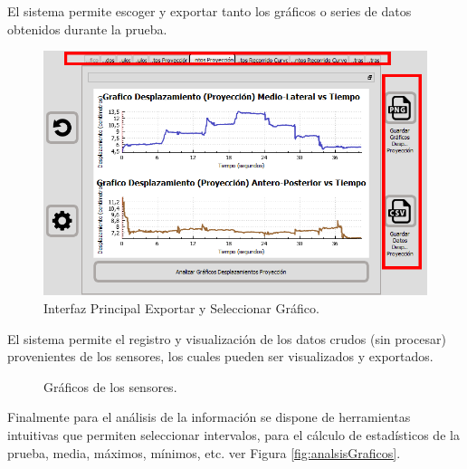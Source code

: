 \documentclass[12pt,a4paper]{article}
\begin{document}
El sistema permite escoger y exportar tanto los gráficos o series de datos obtenidos durante la prueba. 
\begin{figure}[H]
	\centering
	\includegraphics[scale=0.6]{images/graficosyreportes/graficos}
	\caption{Interfaz Principal Exportar y Seleccionar Gráfico.}
	\label{fig:exportargrafico}
\end{figure}
El sistema permite el registro y visualización de los datos crudos (sin procesar) provenientes de los sensores, los cuales pueden ser visualizados y exportados.

\begin{figure}[H]
	\centering
	\caption{Gráficos de los sensores.}
	\label{fig:Graficosensores}
\end{figure}


Finalmente para el análisis de la información se dispone de herramientas intuitivas que permiten seleccionar intervalos, para el cálculo de estadísticos de la prueba, media, máximos, mínimos, etc. ver Figura \ref{fig:analsisGraficos}.
\end{document}
